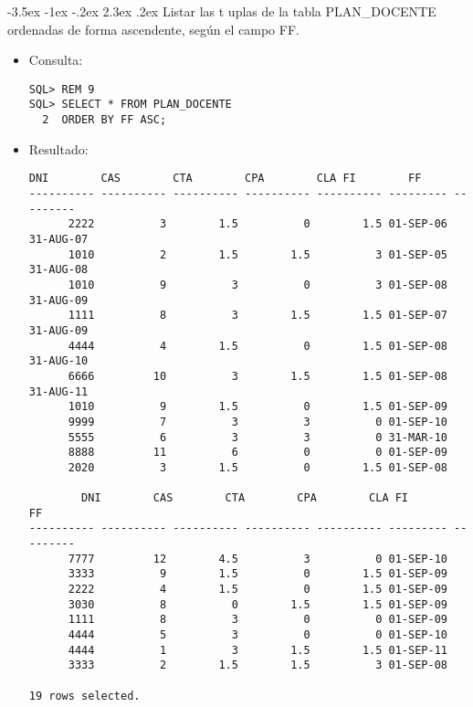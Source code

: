\documentclass[11pt]{report}
\makeatletter
\renewcommand\chapter{\@startsection{chapter}{0}{\z@}%
    {-3.5ex \@plus -1ex \@minus -.2ex}%
    {2.3ex \@plus.2ex}%
    {\normalfont\Large\bfseries}}
\makeatother
\begin{document}
\chapter{Listar las t uplas de la tabla PLAN\_DOCENTE ordenadas de forma ascendente, según el campo FF.}
\begin{itemize}
  \item Consulta:
  \begin{verbatim}
SQL> REM 9
SQL> SELECT * FROM PLAN_DOCENTE
  2  ORDER BY FF ASC;
  \end{verbatim}
  \item{Resultado:}
  \begin{verbatim}
DNI        CAS        CTA        CPA        CLA FI        FF             
---------- ---------- ---------- ---------- ---------- --------- ---------      
      2222          3        1.5          0        1.5 01-SEP-06 31-AUG-07      
      1010          2        1.5        1.5          3 01-SEP-05 31-AUG-08      
      1010          9          3          0          3 01-SEP-08 31-AUG-09      
      1111          8          3        1.5        1.5 01-SEP-07 31-AUG-09      
      4444          4        1.5          0        1.5 01-SEP-08 31-AUG-10      
      6666         10          3        1.5        1.5 01-SEP-08 31-AUG-11      
      1010          9        1.5          0        1.5 01-SEP-09                
      9999          7          3          3          0 01-SEP-10                
      5555          6          3          3          0 31-MAR-10                
      8888         11          6          0          0 01-SEP-09                
      2020          3        1.5          0        1.5 01-SEP-08                

        DNI        CAS        CTA        CPA        CLA FI        FF             
---------- ---------- ---------- ---------- ---------- --------- ---------      
      7777         12        4.5          3          0 01-SEP-10                
      3333          9        1.5          0        1.5 01-SEP-09                
      2222          4        1.5          0        1.5 01-SEP-09                
      3030          8          0        1.5        1.5 01-SEP-09                
      1111          8          3          0          0 01-SEP-09                
      4444          5          3          0          0 01-SEP-10                
      4444          1          3        1.5        1.5 01-SEP-11                
      3333          2        1.5        1.5          3 01-SEP-08                

19 rows selected.
  \end{verbatim}
\end{itemize}
\end{document}
